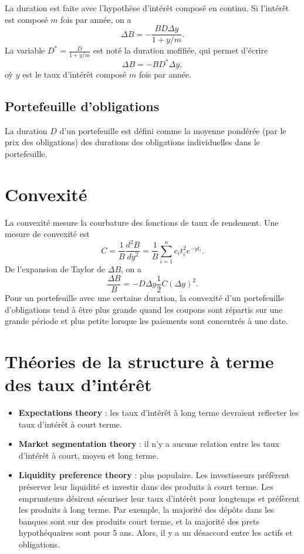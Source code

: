La duration est faite avec l'hypothèse d'intérêt composé en continu. Si l'intérêt est composé $m$ fois par année, on a 
$$\Delta B = - \frac{BD \Delta y}{1 + y/m}.$$
La variable $D^* = \frac{D}{1 + y/m}$ est noté la duration mofifiée, qui permet d'écrire
$$\Delta B = -BD^* \Delta y,$$
oỳ $y$ est le taux d'intérêt composé $m$ fois par année. 

\subsection{Portefeuille d'obligations}

La duration $D$ d'un portefeuille est défini comme la moyenne pondérée (par le prix des obligations) des durations des obligations individuelles dans le portefeuille. 

\section{Convexité}

La convexité mesure la courbature des fonctions de taux de rendement. Une mesure de convexité est
$$C = \frac{1}{B} \frac{d^2 B}{dy^2} = \frac{1}{B} \sum_{i = 1}^{n} c_i t_i^2 e^{-yt_i}.$$
De l'expansion de Taylor de $\Delta B$, on a 
$$\frac{\Delta B}{B} = -D\Delta y  \frac{1}{2} C (\Delta y)^2.$$
Pour un portefeuille avec une certaine duration, la convexité d'un portefeuille d'obligations tend à être plus grande quand les coupons sont répartis sur une grande période et plus petite lorsque les paiements sont concentrés à une date. 

\section{Théories de la structure à terme des taux d'intérêt}

\begin{itemize}
	\item \textbf{Expectations theory} : les taux d'intérêt à long terme devraient reflecter les taux d'intérêt à court terme. 
	\item \textbf{Market segmentation theory} : il n'y a aucune relation entre les taux d'intérêt à court, moyen et long terme. 
	\item \textbf{Liquidity preference theory} : plus populaire. Les investisseurs préfèrent préserver leur liquidité et investir dans des produits à court terme. Les emprunteurs désirent sécuriser leur taux d'intérêt pour longtemps et préfèrent les produits à long terme. Par exemple, la majorité des dépôts dans les banques sont sur des produits court terme, et la majorité des prets hypothéquaires sont pour 5 ans. Alors, il y a un désaccord entre les actifs et obligations. 
\end{itemize}

